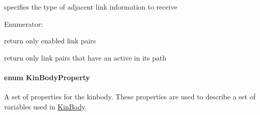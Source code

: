 specifies the type of adjacent link information to receive 

\begin{Desc}
\item[Enumerator: ]\par
\begin{description}
\item[{\em 
\hypertarget{classOpenRAVE_1_1KinBody_ace43b2d7d920eeb2eb69299a4784b040a9d927f87563a4c4eb69c2391905bc015}{
AO\_\-Enabled}
\label{classOpenRAVE_1_1KinBody_ace43b2d7d920eeb2eb69299a4784b040a9d927f87563a4c4eb69c2391905bc015}
}]return only enabled link pairs \item[{\em 
\hypertarget{classOpenRAVE_1_1KinBody_ace43b2d7d920eeb2eb69299a4784b040a471e53775c7eb63178de3a28ed33d64f}{
AO\_\-ActiveDOFs}
\label{classOpenRAVE_1_1KinBody_ace43b2d7d920eeb2eb69299a4784b040a471e53775c7eb63178de3a28ed33d64f}
}]return only link pairs that have an active in its path \end{description}
\end{Desc}

\hypertarget{classOpenRAVE_1_1KinBody_a973dd96959f97246c92245c42bce238f}{
\paragraph[{KinBodyProperty}]{\setlength{\rightskip}{0pt plus 5cm}enum {\bf KinBodyProperty}}\hfill}
\label{classOpenRAVE_1_1KinBody_a973dd96959f97246c92245c42bce238f}


A set of properties for the kinbody. These properties are used to describe a set of variables used in \hyperlink{classOpenRAVE_1_1KinBody}{KinBody}. 

